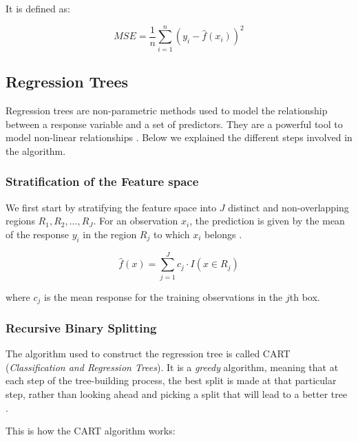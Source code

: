 \documentclass[12 pt]{scrartcl}
\numberwithin{equation}{section}
\begin{document}
It is defined as:

\begin{equation}
    MSE = \frac{1}{n} \sum_{i=1}^n (y_{i} - \hat{f}(x_{i}))^2
\end{equation}

\subsection{Regression Trees}
\label{subsec:Regression Trees}

Regression trees are non-parametric methods used to model the relationship between a response variable and a set of predictors. 
They are a powerful tool to model non-linear relationships \cite[p.372]{stat-learning}. 
Below we explained the different steps involved in the algorithm.

\subsubsection*{Stratification of the Feature space}

We first start by stratifying the feature space into $J$ distinct and non-overlapping regions $R_{1}, R_{2}, ..., R_{J}$.
For an observation $x_{i}$, the prediction is given by the mean of the response $y_{i}$ 
in the region $R_{j}$ to which $x_{i}$ belongs \cite[p.372]{stat-learning}.

\begin{equation}
    \hat{f}(x) = \sum_{j=1}^J c_{j} \cdot I(x \in R_{j})
\end{equation}

where $c_{j}$ is the mean response for the training observations in the $j$th box.

\subsubsection*{Recursive Binary Splitting}

The algorithm used to construct the regression tree is called CART (\textit{Classification and Regression Trees}).
It is a \textit{greedy} algorithm, meaning that at each step of the tree-building process,
the best split is made at that particular step, rather than looking ahead and picking a split that will lead to a better tree \cite[p.372]{stat-learning}.


This is how the CART algorithm works:
\end{document}
